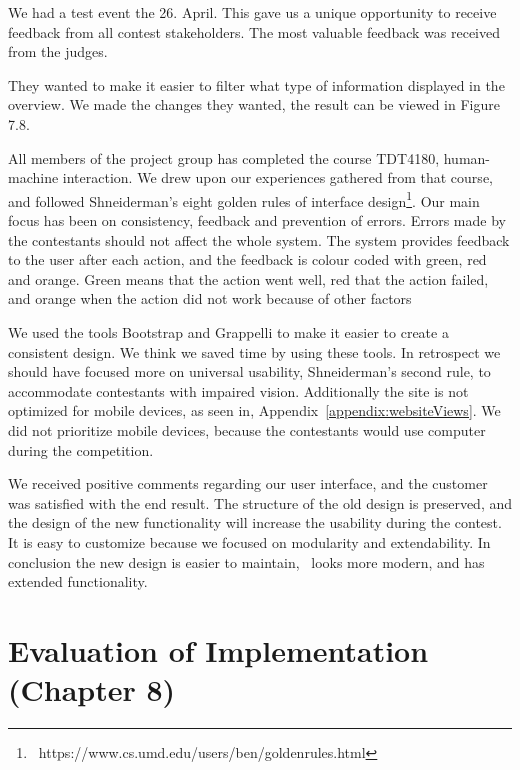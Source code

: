 We had a test event the 26. April. This gave us a unique opportunity to
receive feedback from all contest stakeholders. The most valuable
feedback was received from the judges.

They wanted to make it easier to filter what type of information
displayed in the overview. We made the changes they wanted, the result
can be viewed in Figure 7.8. 

All members of the project group has completed the course TDT4180,
human-machine interaction. We drew upon our experiences gathered from
that course, and followed Shneiderman{\textquoteright}s eight golden
rules of interface
design\footnote{\ https://www.cs.umd.edu/users/ben/goldenrules.html}.
Our main focus has been on consistency, feedback and prevention of
errors. Errors made by the contestants should not affect the whole
system. The system provides feedback to the user after each action, and
the feedback is colour coded with green, red and orange. Green means
that the action went well, red that the action failed, and orange when
the action did not work because of other factors

We used the tools Bootstrap and Grappelli to make it easier to create a
consistent design. We think we saved time by using these tools. In
retrospect we should have focused more on universal usability,
Shneiderman's second rule, to accommodate contestants
with impaired vision. Additionally the site is not optimized for mobile
devices, as seen in, Appendix~\ref{appendix:websiteViews}. We did not prioritize mobile devices,
because the contestants would use computer during the competition. 

We received positive comments regarding our user interface, and the
customer was satisfied with the end result. The structure of the old
design is preserved, and the design of the new functionality will
increase the usability during the contest. It is easy to customize
because we focused on modularity and extendability. In conclusion the
new design is easier to maintain, \ looks more modern, and has extended
functionality. \ 

\pagebreak
\section{Evaluation of Implementation (Chapter 8)}

